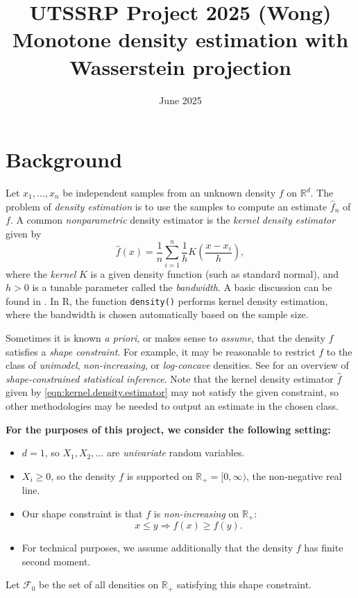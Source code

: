 \documentclass{article}
\title{UTSSRP Project 2025 (Wong)\\
{\large Monotone density estimation with Wasserstein projection}}
\author{}
\date{June 2025}
\newcommand{\bR}{\mathbb{R}}
\newcommand{\cF}{\mathcal{F}}
\numberwithin{equation}{section}
\begin{document}
\maketitle

\section{Background}
Let $x_1, \ldots, x_n$ be independent samples from an unknown density $f$ on $\bR^d$. The problem of {\it density estimation} is to use the samples to compute an estimate $\hat{f}_n$ of $f$. A common {\it nonparametric} density estimator is the {\it kernel density estimator} given by
\begin{equation} \label{eqn:kernel.density.estimator}
\hat{f}(x) = \frac{1}{n} \sum_{i = 1}^n \frac{1}{h}K\left( \frac{x - x_i}{h}\right),
\end{equation}
where the {\it kernel} $K$ is a given density function (such as standard normal), and $h > 0$ is a tunable parameter called the {\it bandwidth}. A basic discussion can be found in \cite[Section 18.4]{K10}. In R, the function \texttt{density()} performs kernel density estimation, where the bandwidth is chosen automatically based on the sample size.

Sometimes it is known {\it a priori}, or makes sense to {\it assume}, that the density $f$ satisfies a {\it shape constraint}. For example, it may be reasonable to restrict $f$ to the class of {\it unimodel}, {\it non-increasing}, or {\it log-concave} densities. See \cite{D24} for an overview of {\it shape-constrained statistical inference}. Note that the kernel density estimator $\hat{f}$ given by \eqref{eqn:kernel.density.estimator} may not satisfy the given constraint, so other methodologies may be needed to output an estimate in the chosen class.

\medskip


{\bf For the purposes of this project, we consider the following setting:}
\begin{itemize}
\item $d = 1$, so $X_1, X_2, \ldots$ are {\it univariate} random variables.
\item $X_i \geq 0$, so the density $f$ is supported on $\bR_+ = [0, \infty)$, the non-negative real line.
\item Our shape constraint is that $f$ is {\it non-increasing} on $\bR_+$:
\[
x \leq y \Rightarrow f(x) \geq f(y).
\]
\item For technical purposes, we assume additionally that the density $f$ has finite second moment.
\end{itemize}
Let $\cF_0$ be the set of all densities on $\bR_+$ satisfying this shape constraint. 
\end{document}
